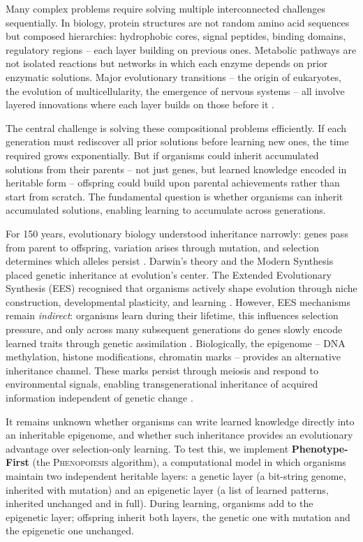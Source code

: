 \documentclass[11pt]{article}
\newcommand{\Pheno}{\textsc{Phenopoiesis}}
\begin{document}
Many complex problems require solving multiple interconnected challenges
sequentially. In biology, protein structures are not random amino acid sequences
but composed hierarchies: hydrophobic cores, signal peptides, binding domains,
regulatory regions -- each layer building on previous ones. Metabolic pathways
are not isolated reactions but networks in which each enzyme depends on prior
enzymatic solutions. Major evolutionary transitions -- the origin of eukaryotes,
the evolution of multicellularity, the emergence of nervous systems -- all
involve layered innovations where each layer builds on those before it
\citep{MaynardSmith1995}.

The central challenge is solving these compositional problems efficiently. If
each generation must rediscover all prior solutions before learning new ones,
the time required grows exponentially. But if organisms could inherit
accumulated solutions from their parents -- not just genes, but learned knowledge
encoded in heritable form -- offspring could build upon parental achievements
rather than start from scratch. The fundamental question is whether organisms
can inherit accumulated solutions, enabling learning to accumulate across
generations.

For 150 years, evolutionary biology understood inheritance narrowly: genes pass
from parent to offspring, variation arises through mutation, and selection
determines which alleles persist \citep{Darwin1859,Huxley1942}. Darwin's theory
and the Modern Synthesis placed genetic inheritance at evolution's center. The
Extended Evolutionary Synthesis (EES) recognised that organisms actively shape
evolution through niche construction, developmental plasticity, and learning
\citep{LalandEtAl2015,Uller2015,WestEberhard2003}. However, EES mechanisms
remain \emph{indirect}: organisms learn during their lifetime, this influences
selection pressure, and only across many subsequent generations do genes slowly
encode learned traits through genetic assimilation
\citep{Waddington1942,HintonNowlan1987}. Biologically, the epigenome -- DNA
methylation, histone modifications, chromatin marks -- provides an alternative
inheritance channel. These marks persist through meiosis and respond to
environmental signals, enabling transgenerational inheritance of acquired
information independent of genetic change
\citep{JablonkaLamb2005,Pembrey2006,WaterlandJirtle2007,Jablonka2014}.

It remains unknown whether organisms can write learned knowledge directly into
an inheritable epigenome, and whether such inheritance provides an evolutionary
advantage over selection-only learning. To test this, we implement
\textbf{Phenotype-First} (the \Pheno{} algorithm), a computational model in
which organisms maintain two independent heritable layers: a genetic layer
(a bit-string genome, inherited with mutation) and an epigenetic layer (a list
of learned patterns, inherited unchanged and in full). During learning,
organisms add to the epigenetic layer; offspring inherit both layers, the
genetic one with mutation and the epigenetic one unchanged.
\end{document}
